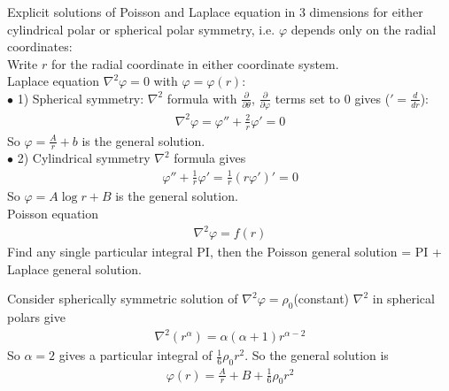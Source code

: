 \documentclass[a4paper]{article}
\begin{document}
Explicit solutions of Poisson and Laplace equation in 3 dimensions for either cylindrical polar or spherical polar symmetry, i.e. $\varphi$ depends only on the radial coordinates:\\
Write $r$ for the radial coordinate in either coordinate system.\\

Laplace equation $\nabla^2 \varphi = 0$ with $\varphi = \varphi\left(r\right)$:\\
$\bullet$ 1) Spherical symmetry: $\nabla^2$ formula with $\frac{\partial}{\partial \theta}$, $\frac{\partial}{\partial \varphi}$ terms set to 0 gives ($'=\frac{d}{dr}$):
\begin{equation*}
\begin{aligned}
\nabla^2 \varphi = \varphi'' + \frac{2}{r} \varphi' = 0
\end{aligned}
\end{equation*}
So $\varphi = \frac{A}{r}+b$ is the general solution.\\

$\bullet$ 2) Cylindrical symmetry $\nabla^2$ formula gives
\begin{equation*}
\begin{aligned}
\varphi'' +\frac{1}{r}\varphi'=\frac{1}{r}\left(r\varphi'\right)'=0
\end{aligned}
\end{equation*}
So $\varphi = A\log r+B$ is the general solution.\\

Poisson equation
\begin{equation*}
\begin{aligned}
\nabla^2 \varphi = f\left(r\right)
\end{aligned}
\end{equation*}
Find any single particular integral PI, then the Poisson general solution = PI + Laplace general solution.\\

\begin{eg}
Consider spherically symmetric solution of $\nabla^2\varphi = \rho_0$(constant)
$\nabla^2$ in spherical polars give
\begin{equation*}
\begin{aligned}
\nabla^2 \left(r^\alpha\right) = \alpha\left(\alpha+1\right)r^{\alpha-2}
\end{aligned}
\end{equation*}
So $\alpha = 2$ gives a particular integral of $\frac{1}{6} \rho_0 r^2$. So the general solution is
\begin{equation*}
\begin{aligned}
\varphi\left(r\right) = \frac{A}{r}+B+\frac{1}{6}\rho_0 r^2
\end{aligned}
\end{equation*}
\end{eg}
\end{document}
